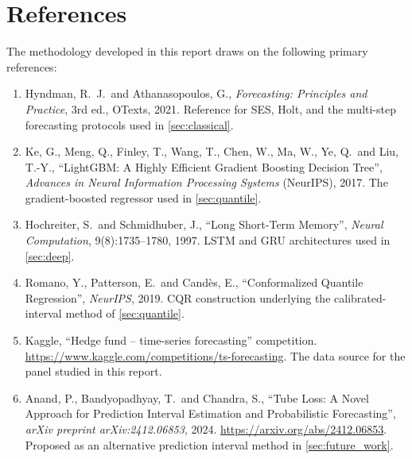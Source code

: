 \section{References}
\label{sec:references}

The methodology developed in this report draws on the following primary references:

\begin{enumerate}
  \item Hyndman, R.~J.\ and Athanasopoulos, G., \emph{Forecasting: Principles and Practice}, 3rd ed., OTexts, 2021. Reference for SES, Holt, and the multi-step forecasting protocols used in \cref{sec:classical}.
  \item Ke, G., Meng, Q., Finley, T., Wang, T., Chen, W., Ma, W., Ye, Q.\ and Liu, T.-Y., ``LightGBM: A Highly Efficient Gradient Boosting Decision Tree'', \emph{Advances in Neural Information Processing Systems} (NeurIPS), 2017. The gradient-boosted regressor used in \cref{sec:quantile}.
  \item Hochreiter, S.\ and Schmidhuber, J., ``Long Short-Term Memory'', \emph{Neural Computation}, 9(8):1735--1780, 1997. LSTM and GRU architectures used in \cref{sec:deep}.
  \item Romano, Y., Patterson, E.\ and Cand\`es, E., ``Conformalized Quantile Regression'', \emph{NeurIPS}, 2019. CQR construction underlying the calibrated-interval method of \cref{sec:quantile}.
  \item Kaggle, ``Hedge fund -- time-series forecasting'' competition. \url{https://www.kaggle.com/competitions/ts-forecasting}. The data source for the panel studied in this report.
  \item \label{anand2024tubeloss} Anand, P., Bandyopadhyay, T.\ and Chandra, S., ``Tube Loss: A Novel Approach for Prediction Interval Estimation and Probabilistic Forecasting'', \emph{arXiv preprint arXiv:2412.06853}, 2024. \url{https://arxiv.org/abs/2412.06853}. Proposed as an alternative prediction interval method in \cref{sec:future_work}.
\end{enumerate}
